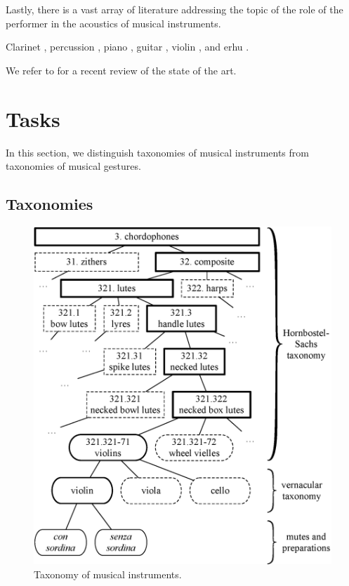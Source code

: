 \documentclass{article}
\begin{document}
Lastly, there is a vast array of literature addressing the topic of the role of the performer in the acoustics of musical instruments.

\cite{metcalf2014frontiers}

Clarinet \cite{loureiro2004ismir}, percussion \cite{tindale2004ismir}, piano \cite{bernays2013smc}, guitar \cite{foulon2013cmmr,su2014ismir,chen2015ismir}, violin \cite{young2008nime}, and erhu \cite{yang2014fma}.


We refer to \cite{leman2017chapter} for a recent review of the state of the art.



\section{Tasks}
In this section, we distinguish taxonomies of musical instruments from taxonomies of musical gestures.


\subsection{Taxonomies}

\begin{figure}[t!]
\centering
\includegraphics[width=\linewidth]{./figs/dendrograms/instrument-dendrogram.eps}
\caption{Taxonomy of musical instruments.}
\label{fig:instrument-dendrogram}
\end{figure}
\end{document}
